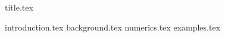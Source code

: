 \documentclass[12pt,a4paper,twoside]{article}
\begin{document}
{title.tex}

\newpage
\tableofcontents
\newpage

\pagestyle{headings}
\raggedbottom

\FloatBarrier

{introduction.tex}
{background.tex}
{numerics.tex}
{examples.tex}

\nocite{*}
\printbibliography
\newpage

\end{document}
